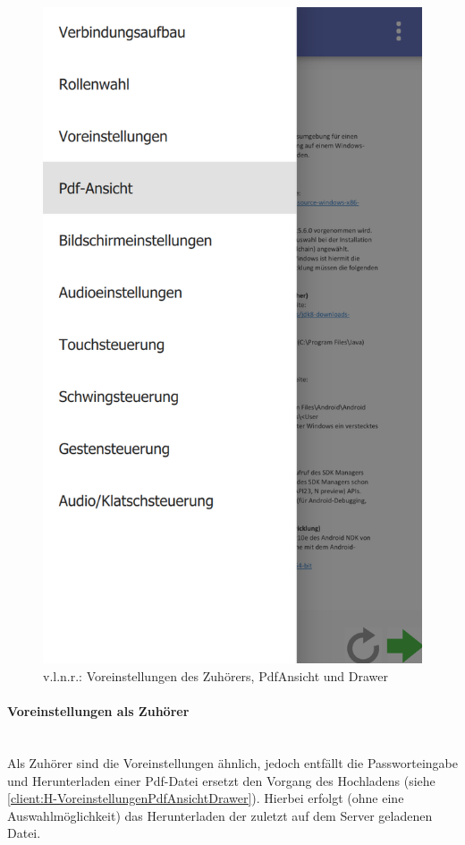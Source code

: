 \begin{figure}[ht!]
\begin{minipage}{0.31\linewidth}
		\includegraphics[scale=0.5]{GUI/Bilder/6-Menu-Button-Drawer-mit-Listview.PNG}
	\end{minipage}
	\caption{v.l.n.r.: Voreinstellungen des Zuhörers, PdfAnsicht und Drawer{\tiny}}
	\label{client:H-VoreinstellungenPdfAnsichtDrawer}
\end{figure}

\newpage

\paragraph{Voreinstellungen als Zuhörer}$\;$\\
Als Zuhörer sind die Voreinstellungen ähnlich, jedoch entfällt die Passworteingabe und Herunterladen einer Pdf-Datei ersetzt den Vorgang des Hochladens (siehe \autoref{client:H-VoreinstellungenPdfAnsichtDrawer}). Hierbei erfolgt (ohne eine Auswahlmöglichkeit) das Herunterladen der zuletzt auf dem Server geladenen Datei.
